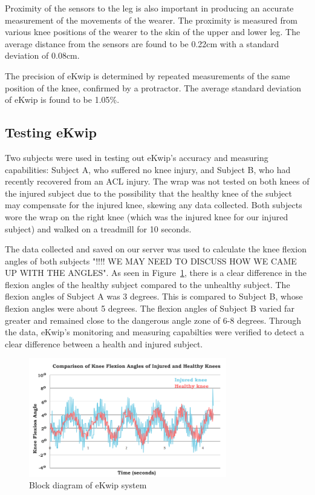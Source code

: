 Proximity of the sensors to the leg is also important in producing an accurate measurement of the movements of the wearer. The proximity is measured from various knee positions of the wearer to the skin of the upper and lower leg. The average distance from the sensors are found to be 0.22cm with a standard deviation of 0.08cm. 

The precision of eKwip is determined by repeated measurements of the same position of the knee, confirmed by a protractor. The average standard deviation of eKwip is found to be 1.05\%.

\subsection {Testing eKwip}
Two subjects were used in testing out eKwip's accuracy and measuring capabilities: Subject A, who suffered no knee injury, and Subject B, who had recently recovered from an ACL injury. The wrap was not tested on both knees of the injured subject due to the possibility that the healthy knee of the subject may compensate for the injured knee, skewing any data collected. Both subjects wore the wrap on the right knee (which was the injured knee for our injured subject) and walked on a treadmill for 10 seconds.

The data collected and saved on our server was used to calculate the knee flexion angles of both subjects "!!!! WE MAY NEED TO DISCUSS HOW WE CAME UP WITH THE ANGLES". As seen in Figure~\ref{fig:results_graph}, there is a clear difference in the flexion angles of the healthy subject compared to the unhealthy subject. The flexion angles of Subject A was 3  degrees. This is compared to Subject B, whose flexion angles were about 5  degrees. The flexion angles of Subject B varied far greater and remained close to the dangerous angle zone of 6-8 degrees. Through the data, eKwip's monitoring and measuring capabilties were verified to detect a clear difference between a health and injured subject.


\begin{figure}[h]
  \begin{center}
    \includegraphics[width=3.4in]{images/results_graph.PNG}
  \end{center}
  \caption{Block diagram of eKwip system}
  \label{fig:results_graph}
\end{figure}